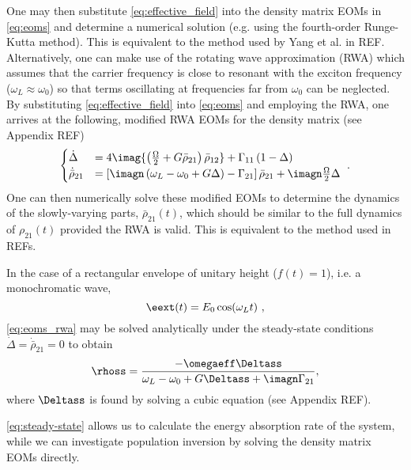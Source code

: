 One may then substitute \cref{eq:effective_field} into the density matrix EOMs
in \cref{eq:eoms} and determine a numerical solution (e.g. using the
fourth-order Runge-Kutta method). This is equivalent to the method used by Yang
et al. in REF. Alternatively, one can make use of the rotating wave
approximation (RWA) which assumes that the carrier frequency is close to
resonant with the exciton frequency ($\omega_L\approx\omega_0$) so that terms
oscillating at frequencies far from $\omega_0$ can be neglected. By
substituting \cref{eq:effective_field} into \cref{eq:eoms} and employing the RWA,
one arrives at the following, modified RWA EOMs for the density matrix (see
Appendix REF)
%
\begin{equation}
    \begin{cases}
        \dot\Delta &= 4\imag{\left( \frac{\Omega}{2}+G\bar\rho_{21} \right)\bar\rho_{12}}
        + \Gamma_{11}\left( 1-\Delta \right) \\
        \dot{\bar\rho}_{21} &= \left[ \imagn\left( \omega_L-\omega_0 +G\Delta
        \right)-\Gamma_{21} \right]\bar\rho_{21} + \imagn\frac{\Omega}{2}\Delta 
    \label{eq:eoms_rwa}
    \end{cases}
    \ .
\end{equation}
%
One can then numerically solve these modified EOMs to determine the dynamics of the
slowly-varying parts, $\bar\rho_{21}(t)$, which should be similar to the full
dynamics of $\rho_{21}(t)$ provided the RWA is valid. This is equivalent to the
method used in REFs.

In the case of a rectangular envelope of unitary height ($f(t)=1$), i.e. a
monochromatic wave, 
%
\begin{equation}
    \eext(t) = E_0\cos(\omega_L t) \ ,
    \label{eq:plane_wave}
\end{equation}
%
\cref{eq:eoms_rwa} may be solved analytically under the steady-state conditions
$\dot\Delta=\dot{\bar\rho}_{21}=0$ to obtain
%
\begin{equation}
    \rhoss =
    \frac{-\omegaeff\Deltass}{\omega_L-\omega_0+G\Deltass
        +\imagn\Gamma_{21}},
    \label{eq:steady-state}
\end{equation}
%
where $\Deltass$ is found by solving a cubic equation (see Appendix REF).

\cref{eq:steady-state} allows us to calculate the energy absorption rate of the
system, while we can investigate population inversion by solving the density
matrix EOMs directly.
